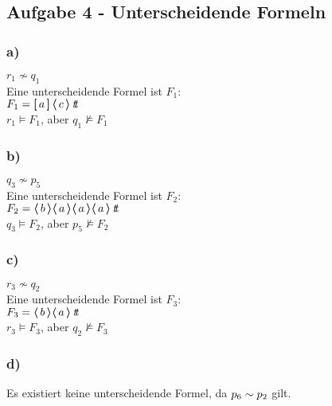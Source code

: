\subsection*{Aufgabe 4 - Unterscheidende Formeln}

\subsubsection*{a)}

$ r_1 \not\sim q_1$ \\
Eine unterscheidende Formel ist $F_1$: \\
$F_1 = \necess{a} \poss{c} \true $ \\
$ r_1 \models F_1$, aber $ q_1 \not\models F_1 $ \\

\subsubsection*{b)}

$ q_3 \not\sim p_5$ \\
Eine unterscheidende Formel ist $F_2$: \\
$F_2 = \poss {b} \poss{a} \poss{a} \poss{a} \true $ \\
$ q_3 \models F_2$, aber $ p_5 \not\models F_2 $ \\

\subsubsection*{c)}

$ r_3 \not\sim q_2$ \\
Eine unterscheidende Formel ist $F_3$: \\
$F_3 = \poss {b}  \poss{a} \true $ \\
$ r_3 \models F_3$, aber $ q_2 \not\models F_3 $ \\


\subsubsection*{d)}
Es existiert keine unterscheidende Formel, da $p_6 \bisim p_2 $ gilt.
